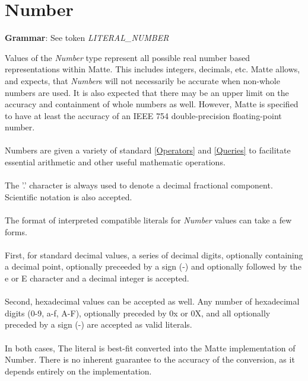 \documentclass[12pt,letterpaper]{report}
\begin{document}



\section{Number}\label{Number}

\textbf{Grammar}: See token \textit{LITERAL\_NUMBER}


Values of the \textit{Number} type represent all possible real number based representations within 
Matte. This includes integers, decimals, etc. Matte allows, and expects, that \textit{Number}s will not 
necessarily be accurate when non-whole numbers are used. It is also expected that there may 
be an upper limit on the accuracy and containment of whole numbers as well. However, Matte is 
specified to have at least the accuracy of an IEEE 754 double-precision floating-point number.
\\\\
Numbers are given a variety of standard \autoref{Operators} and \autoref{Queries} to facilitate 
essential arithmetic and other useful mathematic operations.
\\\\
The '.' character is always used to denote a decimal fractional component. Scientific notation
is also accepted. 
\\\\
The format of interpreted compatible literals for \textit{Number} values can take a few forms. 
\\\\
First, for standard decimal values, a series of decimal digits, optionally containing a decimal point, 
optionally preceeded by a sign (-) and optionally followed by the e or E character and a 
decimal integer is accepted.
\\\\
Second, hexadecimal values can be accepted as well. Any number of hexadecimal digits (0-9, a-f, A-F), 
optionally preceded by 0x or 0X, and all optionally preceded by a sign (-) are accepted 
as valid literals.
\\\\
In both cases, The literal is best-fit converted into the Matte implementation of Number. 
There is no inherent guarantee to the accuracy of the conversion, as it depends 
entirely on the implementation. 
\\\\
\end{document}
